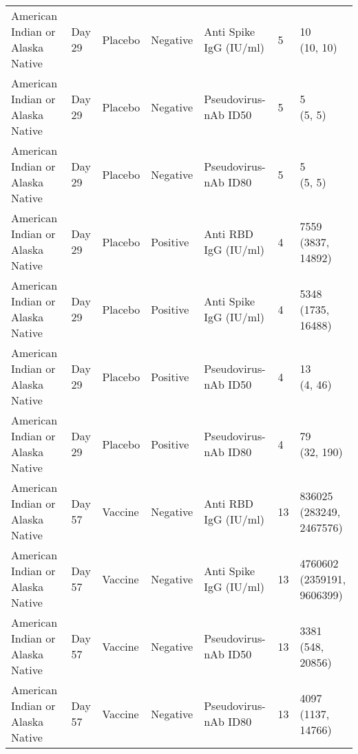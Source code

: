 \documentclass[]{book}
\theoremstyle{definition}
\theoremstyle{definition}
\theoremstyle{definition}
\newcommand{\1}{\mathbbm{1}}
\begin{document}
\begin{landscape}
\begin{ThreePartTable}
\begin{longtable}[t]{>{\raggedright\arraybackslash}p{7cm}llllll}
\hspace{1em}American Indian or Alaska Native & Day 29 & Placebo & Negative & Anti Spike IgG (IU/ml) & 5 & \makecell[l]{10\\(10, 10)}\\
\hspace{1em}American Indian or Alaska Native & Day 29 & Placebo & Negative & Pseudovirus-nAb ID50 & 5 & \makecell[l]{5\\(5, 5)}\\
\hspace{1em}American Indian or Alaska Native & Day 29 & Placebo & Negative & Pseudovirus-nAb ID80 & 5 & \makecell[l]{5\\(5, 5)}\\
\hspace{1em}American Indian or Alaska Native & Day 29 & Placebo & Positive & Anti RBD IgG (IU/ml) & 4 & \makecell[l]{7559\\(3837, 14892)}\\
\hspace{1em}American Indian or Alaska Native & Day 29 & Placebo & Positive & Anti Spike IgG (IU/ml) & 4 & \makecell[l]{5348\\(1735, 16488)}\\
\hspace{1em}American Indian or Alaska Native & Day 29 & Placebo & Positive & Pseudovirus-nAb ID50 & 4 & \makecell[l]{13\\(4, 46)}\\
\hspace{1em}American Indian or Alaska Native & Day 29 & Placebo & Positive & Pseudovirus-nAb ID80 & 4 & \makecell[l]{79\\(32, 190)}\\
\hspace{1em}American Indian or Alaska Native & Day 57 & Vaccine & Negative & Anti RBD IgG (IU/ml) & 13 & \makecell[l]{836025\\(283249, 2467576)}\\
\hspace{1em}American Indian or Alaska Native & Day 57 & Vaccine & Negative & Anti Spike IgG (IU/ml) & 13 & \makecell[l]{4760602\\(2359191, 9606399)}\\
\hspace{1em}American Indian or Alaska Native & Day 57 & Vaccine & Negative & Pseudovirus-nAb ID50 & 13 & \makecell[l]{3381\\(548, 20856)}\\
\hspace{1em}American Indian or Alaska Native & Day 57 & Vaccine & Negative & Pseudovirus-nAb ID80 & 13 & \makecell[l]{4097\\(1137, 14766)}\\

\end{longtable}
\end{ThreePartTable}
\end{landscape}
\end{document}
